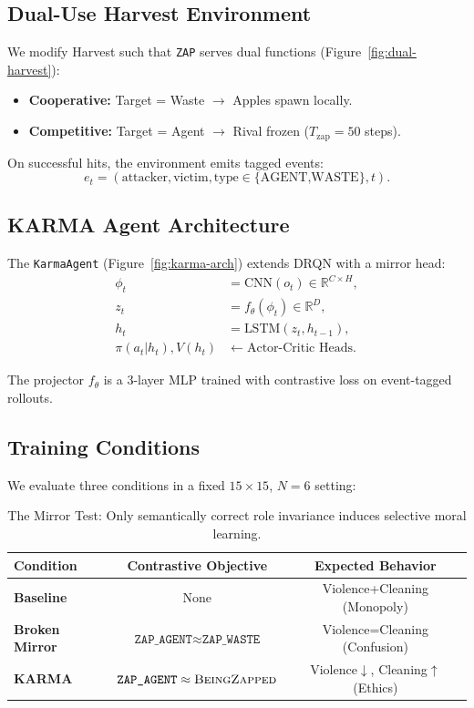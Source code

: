 \documentclass[11pt]{article}
\begin{document}
\subsection{Dual-Use Harvest Environment}

We modify Harvest \citep{leibo2017multi} such that \texttt{ZAP} serves dual functions (Figure~\ref{fig:dual-harvest}):
\begin{itemize}
\item \textbf{Cooperative:} Target = Waste $\rightarrow$ Apples spawn locally.
\item \textbf{Competitive:} Target = Agent $\rightarrow$ Rival frozen ($T_\text{zap}=50$ steps).
\end{itemize}

On successful hits, the environment emits tagged events:
\begin{equation}
e_t = (\text{attacker}, \text{victim}, \text{type}\in\{\text{AGENT,WASTE}\}, t).
\end{equation}

\subsection{KARMA Agent Architecture}

The \texttt{KarmaAgent} (Figure~\ref{fig:karma-arch}) extends DRQN with a mirror head:
\begin{align}
\phi_t &= \text{CNN}(o_t) \in \mathbb{R}^{C\times H},\\
z_t &= f_\theta(\phi_t) \in \mathbb{R}^D,\\
h_t &= \text{LSTM}(z_t, h_{t-1}),\\
\pi(a_t|h_t), V(h_t) &\leftarrow \text{Actor-Critic Heads}.
\end{align}

The projector $f_\theta$ is a $3$-layer MLP trained with contrastive loss on event-tagged rollouts.

\subsection{Training Conditions}

We evaluate three conditions in a fixed $15\times15$, $N=6$ setting:

\begin{table}[h]
\centering
\begin{tabular}{@{}lcc@{}}
\toprule
Condition & Contrastive Objective & Expected Behavior \\
\midrule
\textbf{Baseline} & None & Violence+Cleaning (Monopoly) \\
\textbf{Broken Mirror} & $\texttt{ZAP\_AGENT}\approx\texttt{ZAP\_WASTE}$ & Violence=Cleaning (Confusion) \\
\textbf{KARMA} & $\texttt{ZAP\_AGENT}\approx\textsc{BeingZapped}$ & Violence$\downarrow$, Cleaning$\uparrow$ (Ethics) \\
\bottomrule
\end{tabular}
\caption{The Mirror Test: Only semantically correct role invariance induces selective moral learning.}
\label{tab:conditions}
\end{table}
\end{document}
